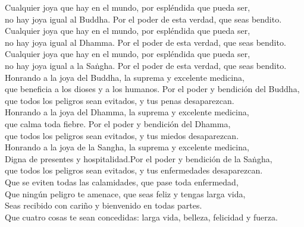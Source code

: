 \begin{onechants}
Cualquier joya que hay en el mundo, por espléndida que pueda ser, \\no hay joya igual al Buddha. Por el poder de esta verdad, que seas bendito.\\
Cualquier joya que hay en el mundo, por espléndida que pueda ser, \\no hay joya igual al Dhamma. Por el poder de esta verdad, que seas bendito.\\
Cualquier joya que hay en el mundo, por espléndida que pueda ser, \\no hay joya igual a la Saṅgha. Por el poder de esta verdad, que seas bendito.\\
Honrando a la joya del Buddha, la suprema y excelente medicina,\\ que beneficia a los dioses y a los humanos. Por el poder y bendición del Buddha,\\ que todos los peligros sean evitados, y tus penas desaparezcan.\\
Honrando a la joya del Dhamma, la suprema y excelente medicina,\\ que calma toda fiebre. Por el poder y bendición del Dhamma,\\ que todos los peligros sean evitados, y tus miedos desaparezcan.\\
Honrando a la joya de la Sangha, la suprema y excelente medicina,\\
Digna de presentes y hospitalidad.Por el poder y bendición de la Saṅgha,\\ que todos los peligros sean evitados, y tus enfermedades desaparezcan.\\
Que se eviten todas las calamidades, que pase toda enfermedad,\\
Que ningún peligro te amenace, que seas feliz y tengas larga vida,\\
Seas recibido con cariño y bienvenido en todas partes.\\
Que cuatro cosas te sean concedidas: larga vida, belleza, felicidad y fuerza.\\
\end{onechants}

\clearpage

\paliText

